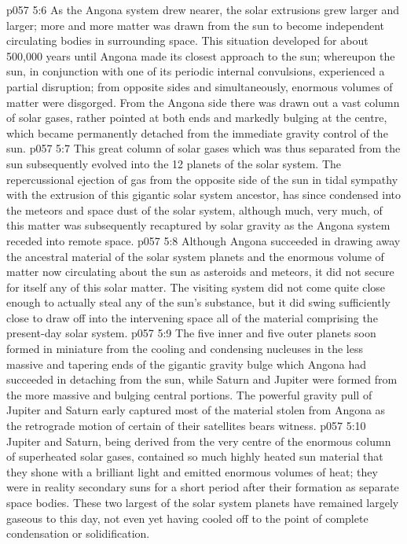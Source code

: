 \vs p057 5:6 As the Angona system drew nearer, the solar extrusions grew larger and larger; more and more matter was drawn from the sun to become independent circulating bodies in surrounding space. This situation developed for about 500,000 years until Angona made its closest approach to the sun; whereupon the sun, in conjunction with one of its periodic internal convulsions, experienced a partial disruption; from opposite sides and simultaneously, enormous volumes of matter were disgorged. From the Angona side there was drawn out a vast column of solar gases, rather pointed at both ends and markedly bulging at the centre, which became permanently detached from the immediate gravity control of the sun.
\vs p057 5:7 This great column of solar gases which was thus separated from the sun subsequently evolved into the 12 planets of the solar system. The repercussional ejection of gas from the opposite side of the sun in tidal sympathy with the extrusion of this gigantic solar system ancestor, has since condensed into the meteors and space dust of the solar system, although much, very much, of this matter was subsequently recaptured by solar gravity as the Angona system receded into remote space.
\vs p057 5:8 Although Angona succeeded in drawing away the ancestral material of the solar system planets and the enormous volume of matter now circulating about the sun as asteroids and meteors, it did not secure for itself any of this solar matter. The visiting system did not come quite close enough to actually steal any of the sun’s substance, but it did swing sufficiently close to draw off into the intervening space all of the material comprising the present\hyp{}day solar system.
\vs p057 5:9 The five inner and five outer planets soon formed in miniature from the cooling and condensing nucleuses in the less massive and tapering ends of the gigantic gravity bulge which Angona had succeeded in detaching from the sun, while Saturn and Jupiter were formed from the more massive and bulging central portions. The powerful gravity pull of Jupiter and Saturn early captured most of the material stolen from Angona as the retrograde motion of certain of their satellites bears witness.
\vs p057 5:10 Jupiter and Saturn, being derived from the very centre of the enormous column of superheated solar gases, contained so much highly heated sun material that they shone with a brilliant light and emitted enormous volumes of heat; they were in reality secondary suns for a short period after their formation as separate space bodies. These two largest of the solar system planets have remained largely gaseous to this day, not even yet having cooled off to the point of complete condensation or solidification.
